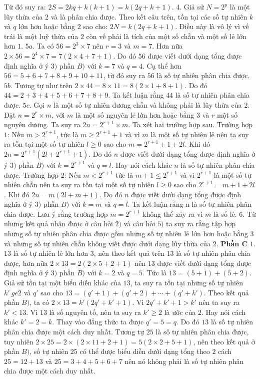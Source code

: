\begin{multicols}{2}
	Từ đó suy ra: $2S=2kq+k(k+1)=k(2q+k+1)$. 
	\vskip 0.05cm
	$4.$ Giả sử $N=2^p$ là một lũy thừa của $2$ và là phân chia được. Theo kết câu trên, tồn tại các số tự nhiên $k$ và $q$ lớn hơn hoặc bằng $2$ sao cho: $2N=k(2q+k+1)$. Điều này là vô lý vì vế trái là một luỹ thừa của $2$ còn vế phải là tích của một số chẵn và một số lẻ lớn hơn $1$. 
	\vskip 0.05cm
	$5a.$ Ta có $56=2^3\times7$ nên $r=3$ và $m=7$. Hơn nữa $2\times 56=2^4\times7=7(2\times4+7+1)$. Do đó $56$ được viết dưới dạng tổng được định nghĩa ở ý $3)$ phần $B)$ với $k=7$ và $q=4$. Cụ thể hơn $56=5+6+7+8+9+10+11$, từ đó suy ra $56$ là số tự nhiên phân chia được. 
	\vskip 0.05cm
	$5b.$ Tương tự như trên $2\times 44=8\times11=8(2\times1+8+1)$. Do đó $44=2+3+4+5+6+7+8+9$. Ta kết luận rằng $44$ là số tự nhiên phân chia được.
	\vskip 0.05cm 
	$5c.$ Gọi $n$ là một số tự nhiên dương chẵn và không phải là lũy thừa của $2$. Đặt $n=2^r\times m$, với $m$ là một số nguyên lẻ lớn hơn hoặc bằng $3$ và $r$ một số nguyên dương. Ta suy ra $2n=2^{r+1}\times m$. Ta xét hai trường hợp sau. 
	\vskip 0.05cm
	Trường hợp $1$: Nếu $m>2^{r+1}$, tức là $m \ge 2^{r+1}+1$ và vì $m$ là một số tự nhiên lẻ nên ta suy ra tồn tại một số tự nhiên $l\ge 0$ sao cho $m=2^{r+1}+1+2l$. Khi đó $2n=2^{r+1}(2l+2^{r+1}+1)$. Do đó $n$ được viết dưới dạng tổng được định nghĩa ở ý $3)$ phần $B)$ với $k=2^{r+1}$ và $q=l$. Hay nói cách khác $n$ là số tự nhiên phân chia được. 
	\vskip 0.05cm
	Trường hợp $2$: Nếu $m<2^{r+1}$ tức là $m+1 \le 2^{r+1}$ và vì $2^{r+1}$ là một số tự nhiên chẵn nên ta suy ra tồn tại một số tự nhiên $l \ge 0$ sao cho $2^{r+1}=m+1+2l$. Khi đó $2n=m(2l+m+1)$. Do đó $n$ được viết dưới dạng tổng được định nghĩa ở ý $3)$ phần $B)$ với $k=m$ và $q=l$. Ta kết luận rằng n là số tự nhiên phân chia được.  
	\vskip 0.05cm
	Lưu ý rằng trường hợp $m=2^{r+1}$ không thể xảy ra vì $m$ là số lẻ. 
	\vskip 0.05cm
	$6.$ Từ những kết quả nhận được ở câu hỏi $2)$ và câu hỏi $5)$ ta suy ra rằng tập hợp những số tự nhiên phân chia được gồm những số tự nhiên lẻ lớn hơn hoặc bằng $3$ và những số tự nhiên chẵn không  viết được dưới dạng lũy thừa của $2$. 
	\vskip 0.05cm
	\textbf{\color{cackithi}Phần C}
	\vskip 0.05cm
	$1.$ $13$ là số tự nhiên lẻ lớn hơn $3$, nên theo kết quả trên $13$ là số tự nhiên phân chia được, hơn nữa $2\times 13=2(2\times 5+2+1)$ nên $13$ được viết dưới dạng tổng được định nghĩa ở ý $3)$ phần $B)$ với $k=2$ và $q=5$. Tức là $13=(5+1)+(5+2)$. Giả sử tồn tại một biểu diễn khác của $13$, ta suy ra tồn tại những số tự nhiên $k'\ ge 2$ và $q'$ sao cho $13=(q'+1)+(q'+2)+\cdots+(q'+k')$. Theo kết quả phần $B)$, ta có $2\times 13=k'(2q'+k'+1)$. Vì $2q'+k'+1>k'$ nên ta suy ra $k'<13$. Vì $13$ là số nguyên tố, nên ta suy ra $k'\ge 2$ là ước của $2$. Hay nói cách khác $k'=2=k$. Thay vào đẳng thức ta được $q'=5=q$. Do đó $13$ là số tự nhiên phân chia được một cách duy nhất. Tương tự $25$ là số tự nhiên phân chia được, tuy nhiên $2\times25=2\times(2\times11+2+1)=5(2\times2+5+1)$, nên theo kết quả ở phần $B)$, số tự nhiên $25$ có thể được biểu diễn dưới dạng tổng theo $2$ cách $25=12+13$ và $25=3+4+5+6+7$ nên nó không phải là số tự nhiên phân chia được một cách duy nhất.

\end{multicols}
